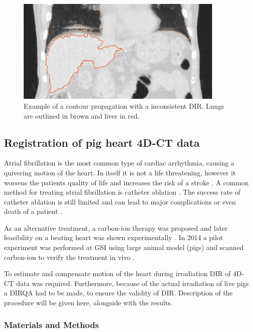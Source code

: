 \documentclass[type=dr, dr=rernat, accentcolor=tud7b,colorbacktitle, bigchapter, openright, twoside, 12pt ]{tudthesis}
\begin{document}
\begin{figure}[H]
	\begin{center}		
		\includegraphics[width=0.9\textwidth]{./Images/ContourPropagation/contourPropagation.png}
		\caption{Example of a contour propagation with a inconsistent DIR. Lungs are outlined in brown and liver in red.}
		\label{contourPropagation}
	\end{center}
\end{figure}


\newpage
\subsection{Registration of pig heart 4D-CT data}

Atrial fibrillation is the most common type of cardiac arrhythmia, causing a quivering motion of the heart. 
In itself it is not a life threatening, however it worsens the patients quality of life and increases the risk of a stroke \cite{Benjamin1998}. 
A common method for treating atrial fibrillation is catheter ablation \cite{January2014}. The success rate of catheter ablation is still limited and 
can lead to major complications or even death of a patient \cite{Cappato2005,Cappato2010}.

As an alternative treatment, a carbon-ion therapy was proposed \cite{Bert2012} and later feasibility on a beating heart was shown experimentally \cite{Lehmann2015b}. In 2014 a pilot experiment was performed at GSI using large animal model (pigs) and
scanned carbon-ion to verify the treatment in vivo \cite{Lehmann2015}.

To estimate and compensate motion of the heart during irradiation DIR of 4D-CT data was required. Furthermore, because of the actual irradiation of live pigs a DIRQA had to be made, to ensure the validity of DIR. Description of the procedure will be given here,
alongside with the results.


\subsubsection{Materials and Methods}
\end{document}
